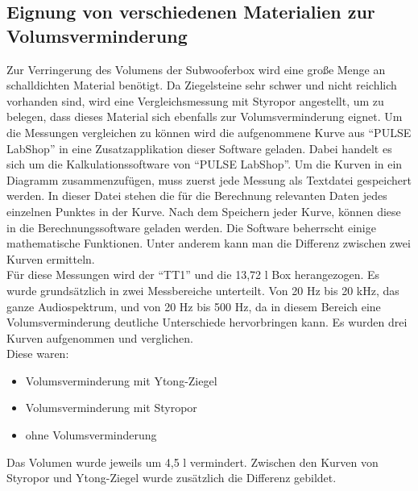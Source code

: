 \subsection{Eignung von verschiedenen Materialien zur Volumsverminderung}\label{subsec:4.4.1}
Zur Verringerung des Volumens der Subwooferbox wird eine große Menge an schalldichten Material benötigt.
Da Ziegelsteine sehr schwer und nicht reichlich vorhanden sind, wird eine Vergleichsmessung mit Styropor angestellt, um zu belegen, dass dieses Material sich ebenfalls zur Volumsverminderung eignet.
Um die Messungen vergleichen zu können wird die aufgenommene Kurve aus \enquote{PULSE LabShop} in eine Zusatzapplikation dieser Software geladen.
Dabei handelt es sich um die Kalkulationssoftware von \enquote{PULSE LabShop}.
Um die Kurven in ein Diagramm zusammenzufügen, muss zuerst jede Messung als 
Textdatei gespeichert werden.
In dieser Datei stehen die für die Berechnung relevanten Daten jedes einzelnen Punktes in der Kurve.
Nach dem Speichern jeder Kurve, können diese in die Berechnungssoftware geladen werden.
Die Software beherrscht einige mathematische Funktionen.
Unter anderem kann man die Differenz zwischen zwei Kurven ermitteln.\\ 
Für diese Messungen wird der \enquote{TT1} und die 13,72 l Box herangezogen.
Es wurde grundsätzlich in zwei Messbereiche unterteilt.
Von 20 Hz bis 20 kHz, das ganze Audiospektrum, und von 20 Hz bis 500 Hz, da in diesem Bereich eine Volumsverminderung deutliche Unterschiede hervorbringen kann.
Es wurden drei Kurven aufgenommen und verglichen.\\
Diese waren:
\begin{itemize}
	\item Volumsverminderung mit Ytong-Ziegel
	\item Volumsverminderung mit Styropor
	\item ohne Volumsverminderung
\end{itemize}
Das Volumen wurde jeweils um 4,5 l vermindert.
Zwischen den Kurven von Styropor und Ytong-Ziegel wurde zusätzlich die Differenz gebildet.

